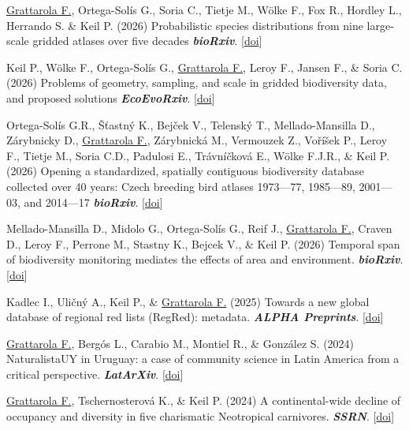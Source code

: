 \documentclass[9pt]{developercv} %
\begin{document}
\begin{etaremune}

\item \underline{Grattarola F.}, Ortega-Solís G., Soria C., Tietje M., Wölke F., Fox R., Hordley L., Herrando S. \& Keil P. (2026) Probabilistic species distributions from nine large-scale gridded atlases over five decades \textit{\textbf{bioRxiv}}. [\href{https://doi.org/10.64898/2026.09.24.754027}{doi}]

\item Keil P., Wölke F., Ortega-Solís G., \underline{Grattarola F.}, Leroy F., Jansen F., \& Soria C. (2026) Problems of geometry, sampling, and scale in gridded biodiversity data, and proposed solutions \textit{\textbf{EcoEvoRxiv}}. [\href{https://doi.org/10.32942/X29373}{doi}]

\item Ortega-Solís G.R., Šťastný K., Bejček V., Telenský T., Mellado-Mansilla D., Zárybnicky D., \underline{Grattarola F.}, Zárybnická M., Vermouzek Z., Voříšek P., Leroy F., Tietje M., Soria C.D., Padulosi E., Trávníčková E., Wölke F.J.R., \& Keil P. (2026) Opening a standardized, spatially contiguous biodiversity database collected over 40 years: Czech breeding bird atlases 1973—77, 1985—89, 2001—03, and 2014—17 \textit{\textbf{bioRxiv}}. [\href{https://doi.org/10.64898/2026.05.29.728651}{doi}]

\item Mellado-Mansilla D., Midolo G., Ortega-Solís G., Reif J., \underline{Grattarola F.}, Craven D., Leroy F., Perrone M., Stastny K., Bejcek V., \& Keil P. (2026) Temporal span of biodiversity monitoring mediates the effects of area and environment. \textit{\textbf{bioRxiv}}. [\href{https://doi.org/10.64898/2026.02.09.704769}{doi}]

\item Kadlec I., Uličný A., Keil P., \& \underline{Grattarola F.} (2025) Towards a new global database of regional red lists (RegRed): metadata. \textit{\textbf{ALPHA Preprints}}. [\href{https://doi.org/10.3897/arphapreprints.e160483}{doi}]

\item \underline{Grattarola F.}, Bergós L., Carabio M., Montiel R., \& González S. (2024) NaturalistaUY in Uruguay: a case of community science in Latin America from a critical perspective. \textit{\textbf{LatArXiv}}. [\href{https://doi.org/10.62059/LatArXiv.preprints.180}{doi}]

\item \underline{Grattarola F.}, Tschernosterová K., \& Keil P. (2024) A continental-wide decline of occupancy and diversity in five charismatic Neotropical carnivores. \textit{\textbf{SSRN}}. [\href{https://doi.org/10.2139/ssrn.4916634}{doi}]


\end{etaremune}
\end{document}
